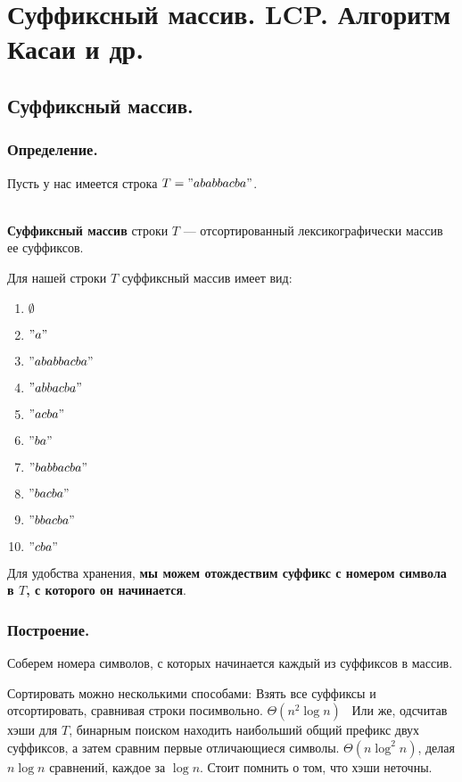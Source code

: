 \section{Суффиксный массив. LCP. Алгоритм Касаи и др.}
\subsection{Суффиксный массив.}

\subsubsection{Определение.}
Пусть у нас имеется строка $T = "ababbacba"$.
\begin{Def} \ \\
    \textbf{Суффиксный массив} строки $T$ --- отсортированный лексикографически массив ее суффиксов.
\end{Def}

\begin{example}
Для нашей строки $T$ суффиксный массив имеет вид:
\begin{enumerate}
    \item $\emptyset$
    \item $"a"$
    \item $"ababbacba"$
    \item $"abbacba"$
    \item $"acba"$
    \item $"ba"$
    \item $"babbacba"$
    \item $"bacba"$
    \item $"bbacba"$
    \item $"cba"$
\end{enumerate}
\end{example}

Для удобства хранения, \textbf{мы можем отождествим суффикс с номером символа в $T$, с которого он начинается}.

\subsubsection{Построение.}
Соберем номера символов, с которых начинается каждый из суффиксов в массив.

Сортировать можно несколькими способами:
Взять все суффиксы и отсортировать, сравнивая строки посимвольно. $\Theta(n ^ 2 \log n)$ \
Или же, одсчитав хэши для $T$, бинарным поиском находить наибольший общий префикс двух суффиксов, а затем сравним первые отличающиеся символы. $\Theta(n \log ^ 2 n)$, делая $n \log{n}$ сравнений, каждое за $\log{n}$.
Стоит помнить о том, что хэши неточны.


